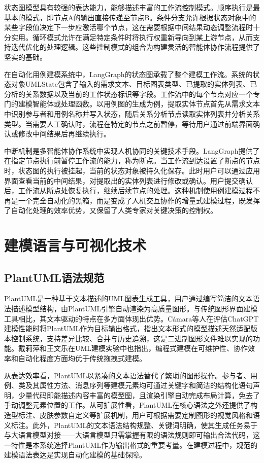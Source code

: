状态图模型具有较强的表达能力，能够描述丰富的工作流控制模式。顺序执行是最基本的模式，即节点A的输出直接传递至节点B。条件分支允许根据状态对象中的某些字段值决定下一步应激活哪个节点，这在需要根据中间结果动态调整流程时十分实用。循环模式允许在满足特定条件时将执行权重新导向到某上游节点，从而支持迭代优化的处理逻辑。这些控制模式的组合为构建灵活的智能体协作流程提供了坚实的基础。

在自动化用例建模系统中，LangGraph的状态图承载了整个建模工作流。系统的状态对象UMLState包含了输入的需求文本、目标图表类型、已提取的实体列表、已分析的关系数据以及当前的工作状态标识等字段。工作流中的每个节点对应一个专门的建模智能体或处理函数。以用例图的生成为例，提取实体节点首先从需求文本中识别参与者和用例名称并写入状态，随后关系分析节点读取实体列表并分析关系类型。当需要人工确认时，流程在特定的节点之前暂停，等待用户通过前端界面确认或修改中间结果后再继续执行。

中断机制是多智能体协作系统中实现人机协同的关键技术手段。LangGraph提供了在指定节点执行前暂停工作流的能力，称为断点。当工作流到达设置了断点的节点时，状态图的执行被挂起，当前的状态对象被持久化保存。此时用户可以通过应用界面查看当前的中间结果，对提取出的实体列表进行修改或确认。用户提交确认后，工作流从断点处恢复执行，继续后续节点的处理。这种机制使用例建模过程不再是一个完全自动化的黑箱，而是变成了人机交互协作的增量式建模过程，既发挥了自动化处理的效率优势，又保留了人类专家对关键决策的控制权。

\section{建模语言与可视化技术}

\subsection{PlantUML语法规范}

PlantUML是一种基于文本描述的UML图表生成工具，用户通过编写简洁的文本语法描述模型结构，由PlantUML引擎自动渲染为高质量图形。与传统图形界面建模工具相比，其文本驱动的特点在多方面体现出优势。Cámara等人\cite{camara2023assessment}在评估ChatGPT建模性能时将PlantUML作为目标输出格式，指出文本形式的模型描述天然适配版本控制系统，支持差异比较、合并与历史追溯，这是二进制图形文件难以实现的功能。戴莉萍和王文乐\cite{dailiping2021}在UML建模实验中也指出，编程式建模在可维护性、协作效率和自动化程度方面均优于传统拖拽式建模。

从表达效率看，PlantUML以紧凑的文本语法替代了繁琐的图形操作。参与者、用例、类及其属性方法、消息序列等建模元素均可通过关键字和简洁的结构化语句声明，少量代码即能描述内容丰富的模型图，且渲染引擎自动完成布局计算，免去了手动调整元素位置的工作。从可扩展性看，PlantUML在核心语法之外还提供了构造型标注、皮肤参数自定义等扩展机制，用户可根据需要定制图形的视觉风格和语义标注。此外，PlantUML的文本语法结构规整、关键词明确，使其生成任务易于与大语言模型对接——大语言模型只需掌握有限的语法规则即可输出合法代码，这一特性是本系统选择PlantUML作为输出格式的重要考量。在建模过程中，规范的建模语法表达是实现自动化建模的基础保障。

